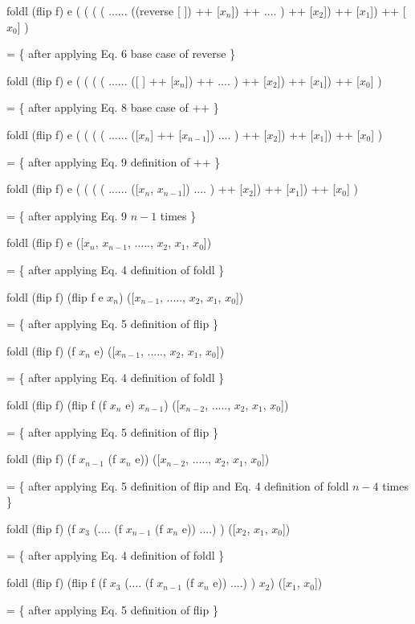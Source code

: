 \documentclass[12pt]{article}
\begin{document}
	 foldl (flip f) e ( ( ( ( ...... ((reverse [ ]) ++ [$x_{n}$]) ++  .... ) ++ [$x_{2}$]) ++ [$x_{1}$]) ++ [$x_{0}$] )

	 = \{ after applying Eq. 6 base case of reverse \}
	 
	 foldl (flip f) e ( ( ( ( ...... ([ ] ++ [$x_{n}$]) ++  .... ) ++ [$x_{2}$]) ++ [$x_{1}$]) ++ [$x_{0}$] )

	 = \{ after applying Eq. 8 base case of ++ \}
	 
	 foldl (flip f) e ( ( ( ( ...... ([$x_{n}$] ++ [$x_{n-1}$]) .... ) ++ [$x_{2}$]) ++ [$x_{1}$]) ++ [$x_{0}$] )

	 = \{ after applying Eq. 9 definition of ++ \}
	 
	 foldl (flip f) e ( ( ( ( ...... ([$x_{n}$, $x_{n-1}$]) .... ) ++ [$x_{2}$]) ++ [$x_{1}$]) ++ [$x_{0}$] )

	 = \{ after applying Eq. 9 $n - 1$ times \}
	 
	 foldl (flip f) e ([$x_{n}$, $x_{n-1}$, ....., $x_{2}$, $x_{1}$, $x_{0}$])
	 
	 = \{ after applying Eq. 4 definition of foldl \}
	 
	 foldl (flip f) (flip f e $x_{n}$) ([$x_{n-1}$, ....., $x_{2}$, $x_{1}$, $x_{0}$])
	 
	 = \{ after applying Eq. 5 definition of flip \}
	 
	 foldl (flip f) (f $x_{n}$ e) ([$x_{n-1}$, ....., $x_{2}$, $x_{1}$, $x_{0}$])
	 
	 = \{ after applying Eq. 4 definition of foldl \}
	 
	 foldl (flip f) (flip f (f $x_{n}$ e) $x_{n-1}$) ([$x_{n-2}$, ....., $x_{2}$, $x_{1}$, $x_{0}$])
	 
	 = \{ after applying Eq. 5 definition of flip \}
	 
	 foldl (flip f) (f $x_{n-1}$ (f $x_{n}$ e)) ([$x_{n-2}$, ....., $x_{2}$, $x_{1}$, $x_{0}$])
	 
	 = \{ after applying Eq. 5 definition of flip and Eq. 4 definition of foldl $n - 4$ times \}
	 
	 foldl (flip f) (f $x_{3}$ (.... (f $x_{n-1}$ (f $x_{n}$ e)) ....) ) ([$x_{2}$, $x_{1}$, $x_{0}$])

	 = \{ after applying Eq. 4 definition of foldl \}
	 
	 foldl (flip f) (flip f (f $x_{3}$ (.... (f $x_{n-1}$ (f $x_{n}$ e)) ....) ) $x_{2}$) ([$x_{1}$, $x_{0}$])

	 = \{ after applying Eq. 5 definition of flip \}
	 
\end{document}

